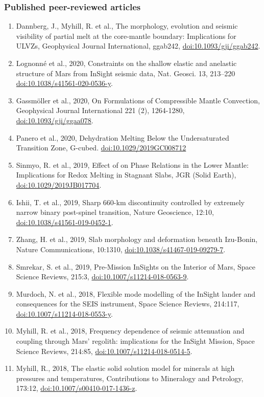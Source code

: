 \documentclass[11pt,twoside,a4paper]{article}
\newcommand{\doi}[1]{\href{http://dx.doi.org/#1}{doi:#1}}
\begin{document}
\subsubsection*{Published peer-reviewed articles}
\begin{enumerate}
\item Dannberg, J., Myhill, R. et al., The morphology, evolution and seismic visibility of partial melt at the core-mantle boundary: Implications for ULVZs, Geophysical Journal International, ggab242, \doi{10.1093/gji/ggab242}.
\item Lognonn\'e et al., 2020, Constraints on the shallow elastic and anelastic structure of Mars from InSight seismic data, Nat. Geosci. 13, 213--220 \doi{10.1038/s41561-020-0536-y}.
\item Gassm{\"o}ller et al., 2020, On Formulations of Compressible Mantle Convection, Geophysical Journal International 221 (2), 1264-1280, \doi{10.1093/gji/ggaa078}.
\item Panero et al., 2020, Dehydration Melting Below the Undersaturated Transition Zone, G-cubed. \doi{10.1029/2019GC008712}
\item Sinmyo, R. et al., 2019, Effect of  on Phase Relations in the Lower Mantle: Implications for Redox Melting in Stagnant Slabs, JGR (Solid Earth), \doi{10.1029/2019JB017704}.
\item Ishii, T. et al., 2019, Sharp 660-km discontinuity controlled by extremely narrow binary post-spinel transition, Nature Geoscience, 12:10, \doi{10.1038/s41561-019-0452-1}.
\item Zhang, H. et al., 2019, Slab morphology and deformation beneath Izu-Bonin, Nature Communications, 10:1310, \doi{10.1038/s41467-019-09279-7}.
\item Smrekar, S. et al., 2019, Pre-Mission InSights on the Interior of Mars, Space Science Reviews, 215:3, \doi{10.1007/s11214-018-0563-9}.
\item Murdoch, N. et al., 2018, Flexible mode modelling of the InSight lander and consequences for the SEIS instrument, Space Science Reviews, 214:117, \doi{10.1007/s11214-018-0553-y}.
\item Myhill, R. et al., 2018, Frequency dependence of seismic attenuation and coupling through Mars' regolith: implications for the InSight Mission, Space Science Reviews, 214:85, \doi{10.1007/s11214-018-0514-5}.
\item Myhill, R., 2018, The elastic solid solution model for minerals at high pressures and temperatures, Contributions to Mineralogy and Petrology, 173:12, \doi{10.1007/s00410-017-1436-z}.

\end{enumerate}
\end{document}
